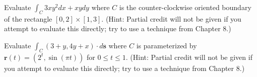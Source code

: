 \documentclass[12pt]{exam}
\newcommand{\vect}[1]{\ensuremath{\mathbf{#1}}}
\newcommand{\<}{(}
\renewcommand{\>}{)}
\begin{document}
\begin{questions}

\question[10]
Evaluate \(\int_C 3xy^2dx + xydy\) where \(C\) is the counter-clockwise
oriented boundary of the rectangle \([0,2]\times[1,3]\). (Hint: Partial credit
will not be given if you attempt to evaluate this directly; try to use a
technique from Chapter 8.)

\vfill

\question[10]
Evaluate \(\int_C (3+y,4y+x)\cdot d\vect s\) where \(C\) is parameterized by
\(\vect r(t)=(2^t,\sin(\pi t))\) for \(0\leq t\leq 1\). (Hint: Partial credit
will not be given if you attempt to evaluate this directly; try to use a
technique from Chapter 8.)

\vfill







\end{questions}
\end{document}
